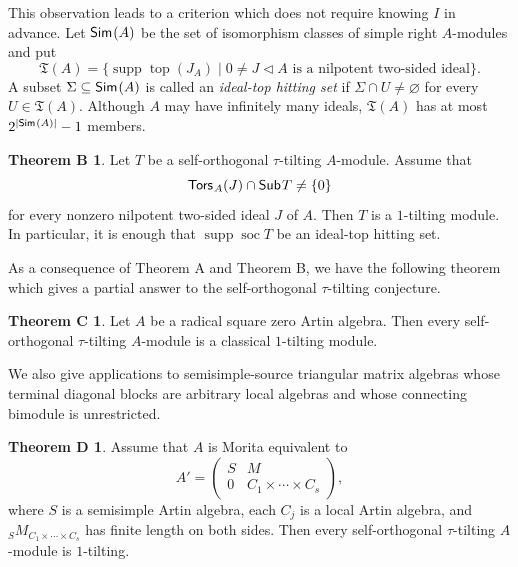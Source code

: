 \documentclass[a4paper,reqno]{amsart}
\theoremstyle{definition}
\newtheorem*{theoremb}{Theorem B}
\newtheorem*{theoremc}{Theorem C}
\newtheorem*{theoremd}{Theorem D}
\newcommand{\rad}{\operatorname{rad}\nolimits}
\newcommand{\soc}{\operatorname{soc}\nolimits}
\newcommand{\topm}{\operatorname{top}\nolimits}
\newcommand{\supp}{\operatorname{supp}\nolimits}
\newcommand{\Sub}{\mathsf{Sub}\hspace{.01in}}
\newcommand{\Tors}{\mathsf{Tors}\hspace{.01in}}
\newcommand{\Sim}{\mathsf{Sim}\hspace{.01in}}
\numberwithin{equation}{section}
\begin{document}
This observation leads to a criterion which does not require knowing
$I$ in advance. Let $\Sim(A)$ be the set of isomorphism classes of
simple right $A$-modules and put
\[
 \mathfrak T(A)=
 \bigl\{\supp\topm(J_A)\mid
 0\neq J\triangleleft A\text{ is a nilpotent two-sided ideal}\bigr\}.
\]
A subset $\Sigma\subseteq\Sim(A)$ is called an \emph{ideal-top
hitting set} if $\Sigma\cap U\neq\varnothing$ for every
$U\in\mathfrak T(A)$. Although $A$ may have infinitely many ideals,
$\mathfrak T(A)$ has at most $2^{|\Sim(A)|}-1$ members.

\begin{theoremb}
Let $T$ be a self-orthogonal $\tau$-tilting $A$-module. Assume that
\[
       \Tors_A(J)\cap\Sub T\neq\{0\}
\]
for every nonzero nilpotent two-sided ideal $J$ of $A$. Then $T$ is
a $1$-tilting module. In particular, it is enough that
$\supp\soc T$ be an ideal-top hitting set.
\end{theoremb}

As a consequence of Theorem A and Theorem B, we have the following theorem which gives a partial answer to the self-orthogonal $\tau$-tilting conjecture.

\begin{theoremc}
Let $A$ be a radical square zero Artin algebra. 
Then every self-orthogonal $\tau$-tilting $A$-module is a classical
$1$-tilting module.
\end{theoremc}


We also give applications to semisimple-source triangular
matrix algebras whose terminal diagonal blocks are arbitrary local
algebras and whose connecting bimodule is unrestricted. 

\begin{theoremd}
Assume that $A$ is Morita equivalent to
\[
 A'=\begin{pmatrix}
       S&M\\
       0&C_1\times\cdots\times C_s
    \end{pmatrix},
\]
where $S$ is a semisimple Artin algebra, each $C_j$ is a local Artin
algebra, and ${}_SM_{C_1\times\cdots\times C_s}$ has finite length on
both sides. Then every
self-orthogonal $\tau$-tilting $A$-module is $1$-tilting.
\end{theoremd}
\end{document}
